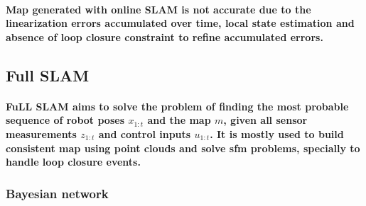 \paragraph{\textnormal{Map generated with online SLAM is not accurate due to the linearization errors accumulated over time, local state estimation and absence of loop closure constraint to refine accumulated errors.}}


\subsection{Full SLAM}
\paragraph{\textnormal{FuLL SLAM aims to solve the problem of finding the most probable sequence of robot poses $ x_{1:t} $ and the map $m$, given all sensor measurements $ z_{1:t} $ and control inputs $ u_{1:t} $\cite{thrun2002probabilistic}. It is mostly used to build consistent map using point clouds and solve \gls{sfm} problems, specially to handle loop closure events. 
}}


\subsubsection{Bayesian network}
